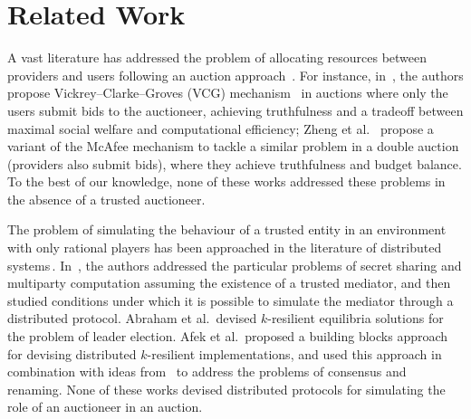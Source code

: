 

\section{Related Work}
\label{sec:related-work}

A vast literature has addressed the problem of allocating resources
between providers and users following an auction approach~\cite{Nisan2001, %
Zheng2014Star, Wang:12,Zhang:13, Popa2012, Niu2012,
Shi:14,  Zhang:14, Zhang2015Truthful}.
For instance, in~\cite{Zhang:14,Zhang2015Truthful}, the authors propose Vickrey–Clarke–Groves (VCG) mechanism~\cite{Nisan2001}
in auctions where only the users submit bids to the auctioneer,
achieving truthfulness and a tradeoff between maximal social welfare and computational efficiency;
Zheng et al.~\cite{Zheng2014Star} propose a variant of the McAfee mechanism 
to tackle a similar problem in a double auction (providers also submit bids),
where they achieve truthfulness and budget balance.
To the best of our knowledge, none of these works addressed these problems
in the absence of a trusted auctioneer.

The problem of simulating the behaviour of a trusted entity
in an environment with only rational players has been approached
in the literature of distributed systems\,\cite{Halpern:04,Abraham:06,Abraham:13,Afek:14}.
In~\cite{Halpern:04,Abraham:06}, the authors addressed the
particular problems of secret sharing and multiparty computation
assuming the existence of a trusted mediator, and then studied
conditions under which it is possible to simulate the mediator
through a distributed protocol. Abraham et al.\,\cite{Abraham:13}
devised $k$-resilient equilibria solutions for the problem of leader election.
Afek et al.\,\cite{Afek:14} proposed a building blocks approach
for devising distributed $k$-resilient implementations, and
used this approach in combination with ideas from~\cite{Abraham:13}
to address the problems of consensus and renaming.
None of these works devised distributed protocols for simulating 
the role of an auctioneer in an auction.
